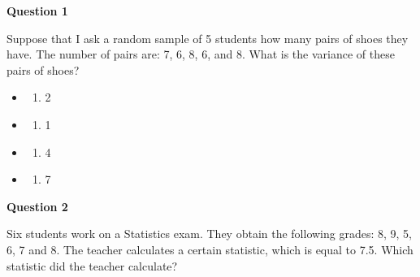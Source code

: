 \documentclass[
  letterpaper,
]{scrbook}
\providecommand{\tightlist}{%
  \setlength{\itemsep}{0pt}\setlength{\parskip}{0pt}}\usepackage{longtable,booktabs,array}
\begin{document}
\textbf{Question 1}

Suppose that I ask a random sample of 5 students how many pairs of shoes
they have. The number of pairs are: 7, 6, 8, 6, and 8. What is the
variance of these pairs of shoes?

\begin{itemize}
\item
  \begin{enumerate}
  \def\labelenumi{(\Alph{enumi})}
  \tightlist
  \item
    2\\
  \end{enumerate}
\item
  \begin{enumerate}
  \def\labelenumi{(\Alph{enumi})}
  \setcounter{enumi}{1}
  \tightlist
  \item
    1\\
  \end{enumerate}
\item
  \begin{enumerate}
  \def\labelenumi{(\Alph{enumi})}
  \setcounter{enumi}{2}
  \tightlist
  \item
    4\\
  \end{enumerate}
\item
  \begin{enumerate}
  \def\labelenumi{(\Alph{enumi})}
  \setcounter{enumi}{3}
  \tightlist
  \item
    7\\
  \end{enumerate}
\end{itemize}

\textbf{Question 2}

Six students work on a Statistics exam. They obtain the following
grades: 8, 9, 5, 6, 7 and 8. The teacher calculates a certain statistic,
which is equal to 7.5. Which statistic did the teacher calculate?
\end{document}

